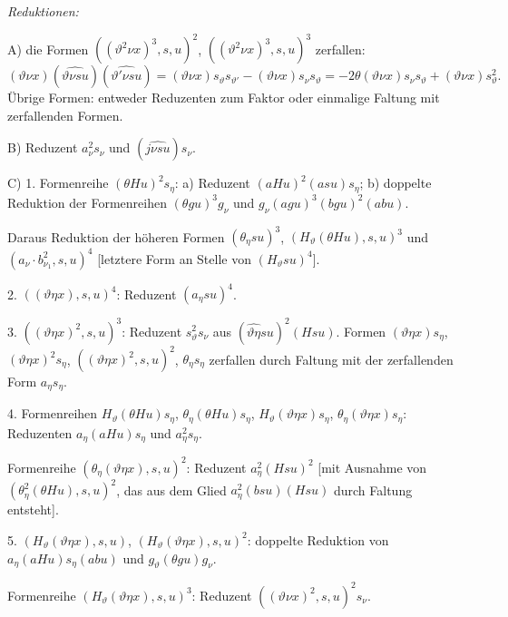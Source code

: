 \noindent\emph{Reduktionen:}

A) die Formen $((\vartheta^2\nu x)^3,s,u)^2$, $((\vartheta^2\nu x)^3,s,u)^3$ zerfallen:
\[
(\vartheta \nu x)(\widehat{\vartheta \nu su})(\widehat{\vartheta'\nu su})
=(\vartheta \nu x)s_\vartheta s_{\vartheta'}-(\vartheta \nu x)s_\nu s_\vartheta
=-2\theta(\vartheta \nu x)s_\nu s_\vartheta+(\vartheta \nu x)s_\vartheta^2.
\]
Übrige Formen: entweder Reduzenten zum Faktor oder einmalige Faltung mit zerfallenden Formen.

B) Reduzent $a_\nu^2s_\nu$ und $(\widehat{j\nu su})s_\nu$.

C) 1. Formenreihe $(\theta Hu)^2s_\eta$: a) Reduzent $(aHu)^2(asu)s_\eta$; b) doppelte Reduktion der Formenreihen $(\theta gu)^3g_\nu$ und $g_\nu(agu)^3(bgu)^2(abu)$.

Daraus Reduktion der höheren Formen $(\theta_\eta su)^3$, $(H_\vartheta(\theta Hu),s,u)^3$ und $(a_\nu\cdot b_{\nu_1}^2,s,u)^4$ [letztere Form an Stelle von $(H_\vartheta su)^4$].

2. $((\vartheta\eta x),s,u)^4$: Reduzent $(a_\eta su)^4$.

3. $((\vartheta\eta x)^2,s,u)^3$: Reduzent $s_\vartheta^2s_\nu$ aus $(\widehat{\vartheta\eta}su)^2(Hsu)$.
Formen $(\vartheta\eta x)s_\eta$, $(\vartheta\eta x)^2s_\eta$, $((\vartheta\eta x)^2,s,u)^2$, $\theta_\eta s_\eta$ zerfallen durch Faltung mit der zerfallenden Form $a_\eta s_\eta$.

4. Formenreihen $H_\vartheta(\theta Hu)s_\eta$, $\theta_\eta(\theta Hu)s_\eta$, $H_\vartheta(\vartheta\eta x)s_\eta$, $\theta_\eta(\vartheta\eta x)s_\eta$:
Reduzenten $a_\eta(aHu)s_\eta$ und $a_\eta^2s_\eta$.

Formenreihe $(\theta_\eta(\vartheta\eta x),s,u)^2$: Reduzent $a_\eta^2(Hsu)^2$ [mit Ausnahme von $(\theta_\eta^2(\theta Hu),s,u)^2$, das aus dem Glied $a_\eta^2(bsu)(Hsu)$ durch Faltung entsteht].

5. $(H_\vartheta(\vartheta\eta x),s,u)$, $(H_\vartheta(\vartheta\eta x),s,u)^2$: doppelte Reduktion von $a_\eta(aHu)s_\eta(abu)$ und $g_\vartheta(\theta gu)g_\nu$.

Formenreihe $(H_\vartheta(\vartheta\eta x),s,u)^3$: Reduzent $((\vartheta \nu x)^2,s,u)^2s_\nu$.

